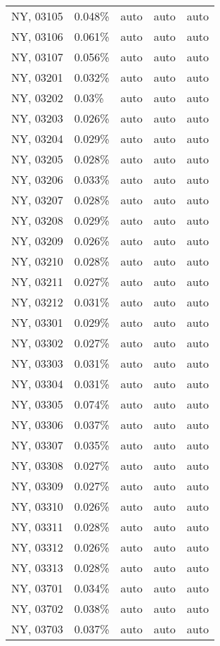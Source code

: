 \begin{longtable}[]{@{}lllll@{}}
NY, 03105 & 0.048\% & auto & auto & auto \\
NY, 03106 & 0.061\% & auto & auto & auto \\
NY, 03107 & 0.056\% & auto & auto & auto \\
NY, 03201 & 0.032\% & auto & auto & auto \\
NY, 03202 & 0.03\% & auto & auto & auto \\
NY, 03203 & 0.026\% & auto & auto & auto \\
NY, 03204 & 0.029\% & auto & auto & auto \\
NY, 03205 & 0.028\% & auto & auto & auto \\
NY, 03206 & 0.033\% & auto & auto & auto \\
NY, 03207 & 0.028\% & auto & auto & auto \\
NY, 03208 & 0.029\% & auto & auto & auto \\
NY, 03209 & 0.026\% & auto & auto & auto \\
NY, 03210 & 0.028\% & auto & auto & auto \\
NY, 03211 & 0.027\% & auto & auto & auto \\
NY, 03212 & 0.031\% & auto & auto & auto \\
NY, 03301 & 0.029\% & auto & auto & auto \\
NY, 03302 & 0.027\% & auto & auto & auto \\
NY, 03303 & 0.031\% & auto & auto & auto \\
NY, 03304 & 0.031\% & auto & auto & auto \\
NY, 03305 & 0.074\% & auto & auto & auto \\
NY, 03306 & 0.037\% & auto & auto & auto \\
NY, 03307 & 0.035\% & auto & auto & auto \\
NY, 03308 & 0.027\% & auto & auto & auto \\
NY, 03309 & 0.027\% & auto & auto & auto \\
NY, 03310 & 0.026\% & auto & auto & auto \\
NY, 03311 & 0.028\% & auto & auto & auto \\
NY, 03312 & 0.026\% & auto & auto & auto \\
NY, 03313 & 0.028\% & auto & auto & auto \\
NY, 03701 & 0.034\% & auto & auto & auto \\
NY, 03702 & 0.038\% & auto & auto & auto \\
NY, 03703 & 0.037\% & auto & auto & auto \\

\end{longtable}
